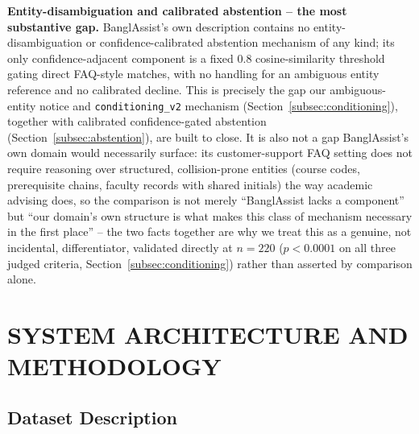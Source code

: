 \documentclass[a4paper,twoside]{article}
\begin{document}
\textbf{Entity-disambiguation and calibrated abstention -- the most substantive gap.} BanglAssist's own description contains no entity-disambiguation or confidence-calibrated abstention mechanism of any kind; its only confidence-adjacent component is a fixed 0.8 cosine-similarity threshold gating direct FAQ-style matches, with no handling for an ambiguous entity reference and no calibrated decline. This is precisely the gap our ambiguous-entity notice and \texttt{conditioning\_v2} mechanism (Section~\ref{subsec:conditioning}), together with calibrated confidence-gated abstention (Section~\ref{subsec:abstention}), are built to close. It is also not a gap BanglAssist's own domain would necessarily surface: its customer-support FAQ setting does not require reasoning over structured, collision-prone entities (course codes, prerequisite chains, faculty records with shared initials) the way academic advising does, so the comparison is not merely ``BanglAssist lacks a component'' but ``our domain's own structure is what makes this class of mechanism necessary in the first place'' -- the two facts together are why we treat this as a genuine, not incidental, differentiator, validated directly at $n=220$ ($p<0.0001$ on all three judged criteria, Section~\ref{subsec:conditioning}) rather than asserted by comparison alone.

\section{\uppercase{System Architecture and Methodology}}
\label{sec:methodology}

\subsection{Dataset Description}
\label{subsec:dataset}
\end{document}
